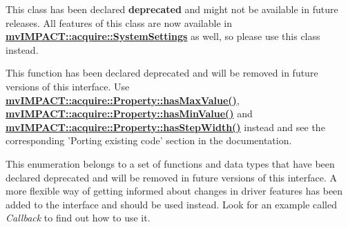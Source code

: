 \begin{DoxyRefList}
This class has been declared {\bfseries deprecated} and might not be available in future releases. All features of this class are now available in {\bfseries \hyperlink{classmv_i_m_p_a_c_t_1_1acquire_1_1_system_settings}{mv\+I\+M\+P\+A\+C\+T\+::acquire\+::\+System\+Settings}} as well, so please use this class instead. 
\item[\label{deprecated__deprecated000015}%
\hypertarget{deprecated__deprecated000015}{}%
成员 \hyperlink{classmv_i_m_p_a_c_t_1_1acquire_1_1_property_a12b00c261f6b436ee85eea1ec5573dd9}{mv\+I\+M\+P\+A\+C\+T\+:\+:acquire\+:\+:Property\+:\+:M\+V\+I\+M\+P\+A\+C\+T\+\_\+\+D\+E\+P\+R\+E\+C\+A\+T\+E\+D\+\_\+\+C\+P\+P} (bool is\+Const\+Defined(\+T\+Property\+Limits constant) const )]This function has been declared deprecated and will be removed in future versions of this interface. Use {\bfseries \hyperlink{classmv_i_m_p_a_c_t_1_1acquire_1_1_property_a8fbc59e51ec6bf739d054078a5aa3021}{mv\+I\+M\+P\+A\+C\+T\+::acquire\+::\+Property\+::has\+Max\+Value()}}, {\bfseries \hyperlink{classmv_i_m_p_a_c_t_1_1acquire_1_1_property_ab94e2773892274787f6745a133493ebb}{mv\+I\+M\+P\+A\+C\+T\+::acquire\+::\+Property\+::has\+Min\+Value()}} and {\bfseries \hyperlink{classmv_i_m_p_a_c_t_1_1acquire_1_1_property_a8b42a3292260a81fc6b72c85934d5564}{mv\+I\+M\+P\+A\+C\+T\+::acquire\+::\+Property\+::has\+Step\+Width()}} instead and see the corresponding 'Porting existing code' section in the documentation. 
\item[\label{deprecated__deprecated000001}%
\hypertarget{deprecated__deprecated000001}{}%
成员 \hyperlink{group___common_interface_ga0947eb7d6a73b9baab283cbf65cd8d6b}{T\+Device\+Event\+Type} ]This enumeration belongs to a set of functions and data types that have been declared deprecated and will be removed in future versions of this interface. A more flexible way of getting informed about changes in driver features has been added to the interface and should be used instead. Look for an example called {\itshape Callback} to find out how to use it. 
\end{DoxyRefList}